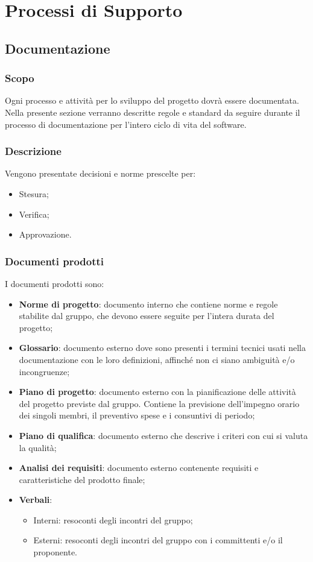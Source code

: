 \section{Processi di Supporto}
\subsection{Documentazione}
\subsubsection{Scopo}
Ogni processo e attività per lo sviluppo del progetto dovrà essere documentata. Nella presente sezione verranno descritte regole e standard da seguire durante il processo di documentazione per l’intero ciclo di vita del software.

\subsubsection{Descrizione}
Vengono presentate decisioni e norme prescelte per:
\begin{itemize}
  \item Stesura;
  \item Verifica;
  \item Approvazione.
\end{itemize}

\subsubsection{Documenti prodotti}
I documenti prodotti sono:
\begin{itemize}
  \item \textbf{Norme di progetto}: documento interno che contiene norme e regole stabilite dal gruppo, che devono essere seguite per l’intera durata del progetto;
  \item \textbf{Glossario}: documento esterno dove sono presenti i termini tecnici usati nella documentazione con le loro definizioni, affinché non ci siano ambiguità e/o incongruenze;
  \item \textbf{Piano di progetto}: documento esterno con la pianificazione delle attività del progetto previste dal gruppo. Contiene la previsione dell’impegno orario dei singoli membri, il preventivo spese e i consuntivi di periodo;
  \item \textbf{Piano di qualifica}: documento esterno che descrive i criteri con cui si valuta la qualità;
  \item \textbf{Analisi dei requisiti}: documento esterno contenente requisiti e caratteristiche del prodotto finale;
  \item \textbf{Verbali}:
  \begin{itemize}
  		\item Interni: resoconti degli incontri del gruppo;
  		\item Esterni: resoconti degli incontri del gruppo con i committenti e/o il proponente.
	\end{itemize}
\end{itemize}

